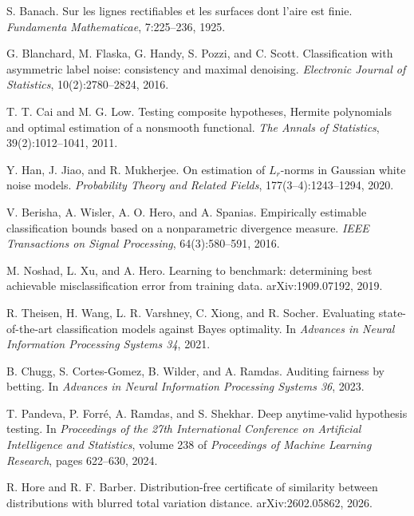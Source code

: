 S. Banach.
\newblock Sur les lignes rectifiables et les surfaces dont l'aire est finie.
\newblock \emph{Fundamenta Mathematicae}, 7:225--236, 1925.

G. Blanchard, M. Flaska, G. Handy, S. Pozzi, and C. Scott.
\newblock Classification with asymmetric label noise: consistency and maximal denoising.
\newblock \emph{Electronic Journal of Statistics}, 10(2):2780--2824, 2016.

T. T. Cai and M. G. Low.
\newblock Testing composite hypotheses, {H}ermite polynomials and optimal estimation of a nonsmooth functional.
\newblock \emph{The Annals of Statistics}, 39(2):1012--1041, 2011.

Y. Han, J. Jiao, and R. Mukherjee.
\newblock On estimation of {$L_r$}-norms in {G}aussian white noise models.
\newblock \emph{Probability Theory and Related Fields}, 177(3--4):1243--1294, 2020.

V. Berisha, A. Wisler, A. O. Hero, and A. Spanias.
\newblock Empirically estimable classification bounds based on a nonparametric divergence measure.
\newblock \emph{IEEE Transactions on Signal Processing}, 64(3):580--591, 2016.

M. Noshad, L. Xu, and A. Hero.
\newblock Learning to benchmark: determining best achievable misclassification error from training data.
\newblock arXiv:1909.07192, 2019.

R. Theisen, H. Wang, L. R. Varshney, C. Xiong, and R. Socher.
\newblock Evaluating state-of-the-art classification models against {B}ayes optimality.
\newblock In \emph{Advances in Neural Information Processing Systems 34}, 2021.

B. Chugg, S. Cortes-Gomez, B. Wilder, and A. Ramdas.
\newblock Auditing fairness by betting.
\newblock In \emph{Advances in Neural Information Processing Systems 36}, 2023.

T. Pandeva, P. Forr{\'e}, A. Ramdas, and S. Shekhar.
\newblock Deep anytime-valid hypothesis testing.
\newblock In \emph{Proceedings of the 27th International Conference on Artificial Intelligence and Statistics},
volume 238 of \emph{Proceedings of Machine Learning Research}, pages 622--630, 2024.

R. Hore and R. F. Barber.
\newblock Distribution-free certificate of similarity between distributions with blurred total variation distance.
\newblock arXiv:2602.05862, 2026.

